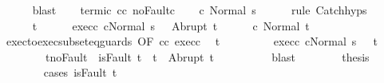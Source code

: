 \begin{isabellebody}
\ \ \ \ \isamarkupfalse%
\ blast\isanewline
\ \ \isamarkupfalse%
\ termi{\isacharunderscore}c{}{\isacharprime}\ c{}{\isacharunderscore}c{}{\isacharprime}\ noFault{\isacharunderscore}c{}{\isacharprime}\isanewline
\ \ \isamarkupfalse%
\ {\isachardoublequoteopen}{\isasymGamma}{\isasymturnstile}c{}{\isasymdown}\ Normal\ s{\isachardoublequoteclose}\isanewline
\ \ \ \ \isamarkupfalse%
\ {\isacharparenleft}rule\ Catch{\isachardot}hyps{\isacharparenright}\isanewline
\ \ \isamarkupfalse%
\isanewline
\ \ \isacommand{{\isacharbraceleft}}\isamarkupfalse%
\isanewline
\ \ \ \ \isamarkupfalse%
\ t\isanewline
\ \ \ \ \isamarkupfalse%
\ exec{\isacharunderscore}c{}{\isacharcolon}\ {\isachardoublequoteopen}{\isasymGamma}{\isasymturnstile}{\isasymlangle}c{}{\isacharcomma}Normal\ s\ {\isasymrangle}\ {\isasymRightarrow}\ Abrupt\ t{\isachardoublequoteclose}\isanewline
\ \ \ \ \isamarkupfalse%
\ {\isachardoublequoteopen}{\isasymGamma}{\isasymturnstile}c{}{\isasymdown}\ Normal\ t{\isachardoublequoteclose}\isanewline
\ \ \ \ \isamarkupfalse%
\ {\isacharminus}\isanewline
\ \ \ \ \ \ \isamarkupfalse%
\ exec{\isacharunderscore}to{\isacharunderscore}exec{\isacharunderscore}subseteq{\isacharunderscore}guards\ {\isacharbrackleft}OF\ c{}{\isacharunderscore}c{}{\isacharprime}\ exec{\isacharunderscore}c{}{\isacharbrackright}\ \isamarkupfalse%
\ t{\isacharprime}\ \isanewline
\ \ \ \ \ \ \ \ exec{\isacharunderscore}c{}{\isacharprime}{\isacharcolon}\ {\isachardoublequoteopen}{\isasymGamma}{\isasymturnstile}{\isasymlangle}c{}{\isacharprime}{\isacharcomma}Normal\ s\ {\isasymrangle}\ {\isasymRightarrow}\ t{\isacharprime}{\isachardoublequoteclose}\ \isanewline
\ \ \ \ \ \ \ \ t{\isacharprime}{\isacharunderscore}noFault{\isacharcolon}\ {\isachardoublequoteopen}{\isasymnot}\ isFault\ t{\isacharprime}\ {\isasymlongrightarrow}\ t{\isacharprime}\ {\isacharequal}\ Abrupt\ t{\isachardoublequoteclose}\isanewline
\ \ \ \ \ \ \ \ \isamarkupfalse%
\ blast\isanewline
\ \ \ \ \ \ \isamarkupfalse%
\ {\isacharquery}thesis\isanewline
\ \ \ \ \ \ \isamarkupfalse%
\ {\isacharparenleft}cases\ {\isachardoublequoteopen}isFault\ t{\isacharprime}{\isachardoublequoteclose}{\isacharparenright}\isanewline

\end{isabellebody}
